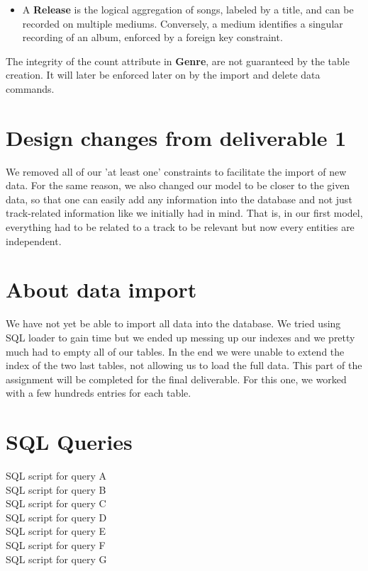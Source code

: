 \documentclass{article}
\begin{document}
{\begin{itemize}
  \item A \textbf{Release} is the logical aggregation of songs, labeled by a title, and can be recorded on multiple mediums. 
  Conversely, a medium identifies a singular recording of an album, enforced by a foreign key constraint.
\end{itemize}

The integrity of the count attribute in \textbf{Genre}, are not guaranteed by the table creation. It will
later be enforced later on by the import and delete data commands.

}

\section*{Design changes from deliverable 1}
We removed all of our 'at least one' constraints to facilitate the import of new data. For the same reason, we also changed our model to be closer to the given data, so that 
one can easily add any information into the database and not just track-related information like we initially had in mind. That is, in our first model, everything 
had to be related to a track to be relevant but now every entities are independent. 

\section*{About data import}
We have not yet be able to import all data into the database. We tried using SQL loader to gain time but we ended
up messing up our indexes and we pretty much had to empty all of our tables. In the end we were unable to extend the index of the two last tables, not allowing us to load the full data. 
This part of the assignment will be completed for the final deliverable. For this one, we worked with a few hundreds entries
for each table. 

\section*{SQL Queries}
{SQL script for query A} \\
{SQL script for query B} \\
{SQL script for query C} \\
{SQL script for query D} \\
{SQL script for query E} \\
{SQL script for query F} \\
{SQL script for query G} \\
\end{document}
